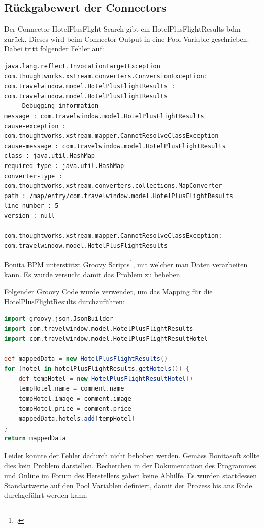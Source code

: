 \subsection{Rückgabewert der Connectors}
Der Connector HotelPlusFlight Search gibt ein HotelPlusFlightResults \gls{bdm} zurück. Dieses wird beim Connector Output in eine Pool Variable geschrieben. Dabei tritt folgender Fehler auf:
\begin{lstlisting}
java.lang.reflect.InvocationTargetException
com.thoughtworks.xstream.converters.ConversionException: com.travelwindow.model.HotelPlusFlightResults : com.travelwindow.model.HotelPlusFlightResults
---- Debugging information ----
message : com.travelwindow.model.HotelPlusFlightResults
cause-exception : com.thoughtworks.xstream.mapper.CannotResolveClassException
cause-message : com.travelwindow.model.HotelPlusFlightResults
class : java.util.HashMap
required-type : java.util.HashMap
converter-type : com.thoughtworks.xstream.converters.collections.MapConverter
path : /map/entry/com.travelwindow.model.HotelPlusFlightResults
line number : 5
version : null

com.thoughtworks.xstream.mapper.CannotResolveClassException: com.travelwindow.model.HotelPlusFlightResults
\end{lstlisting}
Bonita BPM unterstützt Groovy Scripts\footcite{Groovy_2016-06-25}, mit welcher man Daten verarbeiten kann. Es wurde versucht damit das Problem zu beheben.

Folgender Groovy Code wurde verwendet, um das Mapping für die HotelPlusFlightResults durchzuführen:
\begin{lstlisting}[language=Groovy,firstnumber=1]
import groovy.json.JsonBuilder
import com.travelwindow.model.HotelPlusFlightResults
import com.travelwindow.model.HotelPlusFlightResultHotel

def mappedData = new HotelPlusFlightResults()
for (hotel in hotelPlusFlightResults.getHotels()) {
	def tempHotel = new HotelPlusFlightResultHotel()
	tempHotel.name = comment.name
	tempHotel.image = comment.image
	tempHotel.price = comment.price
	mappedData.hotels.add(tempHotel)
}
return mappedData
\end{lstlisting}
Leider konnte der Fehler dadurch nicht behoben werden. Gemäss Bonitasoft sollte dies kein Problem darstellen. Recherchen in der Dokumentation des Programmes und Online im Forum des Herstellers gaben keine Abhilfe. Es wurden stattdessen Standartwerte auf den Pool Variablen definiert, damit der Prozess bis ans Ende durchgeführt werden kann.

